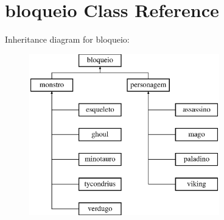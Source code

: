 \hypertarget{classbloqueio}{}\section{bloqueio Class Reference}
\label{classbloqueio}
Inheritance diagram for bloqueio\+:\begin{figure}[H]
\begin{center}
\leavevmode
\includegraphics[height=7.000000cm]{classbloqueio}
\end{center}
\end{figure}
